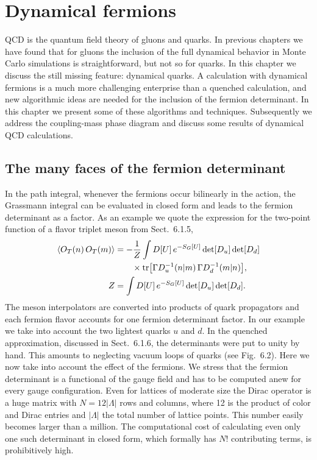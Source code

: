 
\chapter{Dynamical fermions}

QCD is the quantum field theory of gluons and quarks. In previous chapters
we have found that for gluons the inclusion of the full dynamical behavior
in Monte Carlo simulations is straightforward, but not so for quarks. In this
chapter we discuss the still missing feature: dynamical quarks.
A calculation with dynamical fermions is a much more challenging enterprise
than a quenched calculation, and new algorithmic ideas are needed for the
inclusion of the fermion determinant. In this chapter we present some of these
algorithms and techniques. Subsequently we address the coupling-mass phase
diagram and discuss some results of dynamical QCD calculations.

\section{The many faces of the fermion determinant}

In the path integral, whenever the fermions occur bilinearly in the action, the
Grassmann integral can be evaluated in closed form and leads to the fermion
determinant as a factor. As an example we quote the expression for the
two-point function of a flavor triplet meson from Sect.~6.1.5,
\begin{equation}
\begin{split}
\left\langle O_T(n)\,O_T(m) \right\rangle &= -\frac{1}{Z}\int D[U]\,e^{-S_G[U]}\det[D_u]\det[D_d]\\
&\qquad\times \operatorname{tr}\!\big[\Gamma D_u^{-1}(n|m)\,\Gamma D_d^{-1}(m|n)\big],\\
Z &= \int D[U]\,e^{-S_G[U]}\det[D_u]\det[D_d].
\end{split}
\end{equation}
The meson interpolators are converted into products of quark propagators and
each fermion flavor accounts for one fermion determinant factor. In our example
we take into account the two lightest quarks $u$ and $d$. In the quenched
approximation, discussed in Sect.~6.1.6, the determinants were put to unity by
hand. This amounts to neglecting vacuum loops of quarks (see Fig.~6.2).
Here we now take into account the effect of the fermions. We stress that the
fermion determinant is a functional of the gauge field and has to be computed
anew for every gauge configuration. Even for lattices of moderate size the
Dirac operator is a huge matrix with $N = 12|\Lambda|$ rows and columns, where
12 is the product of color and Dirac entries and $|\Lambda|$ the total number
of lattice points. This number easily becomes larger than a million. The
computational cost of calculating even only one such determinant in closed
form, which formally has $N!$ contributing terms, is prohibitively high.

